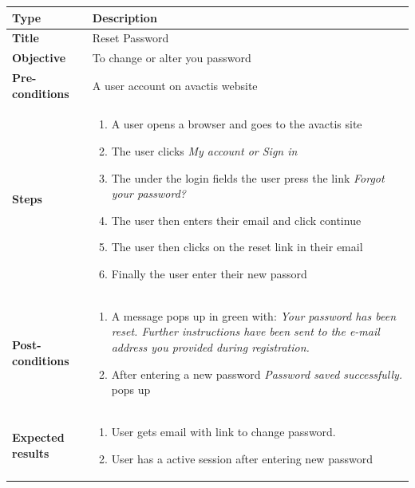\documentclass[UKenglish,12pt]{article}
\begin{document}
\begin{itemize}
\begin{table}[!htbp]
\small
\begin{tabular}{| p{5cm} | p{10cm} | }
	\hline
	\textbf{Type} & \textbf{Description} \\ \hline
	 \textbf{Title} & Reset Password\\ \hline
	 \textbf{Objective} & To change or alter you password\\ \hline
	 \textbf{Pre-conditions} & A user account on avactis website\\ \hline
	 \textbf{Steps} & \begin{enumerate} \item A user opens a browser and goes to the avactis site \item The user clicks \textit{My account or Sign in} \item The under the login fields the user press the link \textit{Forgot your password?} \item The user then enters their email and click continue \item The user then clicks on the reset link in their email \item Finally the user enter their new passord \end{enumerate} \\ \hline
	 \textbf{Post-conditions} & \begin{enumerate} \item A message pops up in green with: \textit{Your password has been reset. Further instructions have been sent to the e-mail address you provided during registration.} \item After entering a new password \textit{Password saved successfully.} pops up \end{enumerate}\\ \hline
	 \textbf{Expected results} & \begin{enumerate} \item User gets email with link to change password. \item User has a active session after entering new password \end{enumerate} \\ 
	 \hline
\end{tabular} %
\end{table}


\end{itemize}
\end{document}
